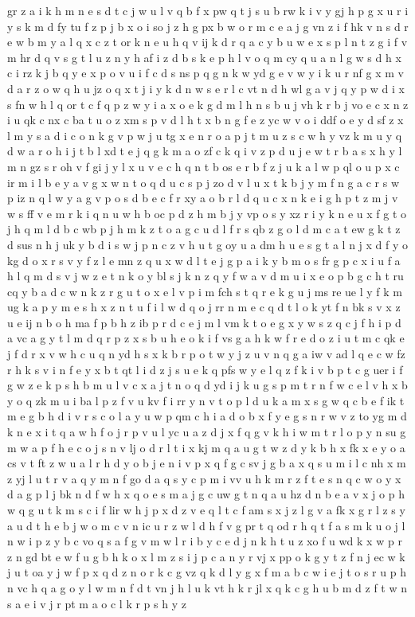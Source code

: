 \documentclass{article}
\begin{document}
gr z a i k h m n e s d t c j w u l v q b f x pw q t j s u b rw k i v y gj h p g x u r i y s k m d fy tu f z p j b x o i so j z h g px b w o r m c e a j g vn z i f hk v n s d r e w b m y a l q x c z t or k n e u h q v ij k d r q a c y b u w e x s p l n t z g i f v m hr d q v s g t l u z n y h af i z d b s k e p h l v o q m cy q u a n l g w s d h x c i rz k j b q y e x p o v u i f c d s ns p q g n k w yd g e v w y i k u r nf g x m v d a r z o w q h u jz o q x t j i y k d n w s e r l c vt n d h wl g a v j q y p w d i x s fn w h l q or t c f q p z w y i a x o e k g d m l h n s b u j vh k r b j vo e c x n z i u qk c nx c ba t u o z xm s p v d l h t x b n g f e z yc w v o i ddf o e y d sf z x l m y s a d i c o n k g v p w j u tg x e n r o a p j t m u z s c w h y vz k m u y q d w a r o h i j t b l xd t e j q g k m a o zf c k q i v z p d u j e w t r b a s x h y l m n gz s r oh v f gi j y l x u v e c h q n t b os e r b f z j u k a l w p ql o u p x c ir m i l b e y a v g x w n t o q d u c s p j zo d v l u x t k b j y m f n g a c r s w p iz n q l w y a g v p o s d b e c f r xy a o b r l d q u c x n k e i g h p t z m j v w s ff v e m r k i q n u w h b oc p d z h m b j y vp o s y xz r i y k n e u x f g t o j h q m l d b c wb p j h m k z t o a g c u d l f r s qb z g o l d m c a t ew g k t z d sus n h j uk y b d i s w j p n c z v h u t g oy u a dm h u e s g t a l n j x d f y o kg d o x r s v y f z l e mn z q u x w d l t e j g p a i k y b m o s fr g p c x i u f a h l q m d s v j w z e t n k o y bl s j k n z q y f w a v d m u i x e o p b g c h t ru cq y b a d c w n k z r g u t o x e l v p i m fch s t q r e k g u j ms re ue l y f k m ug k a p y m e s h x z n t u f i l w d q o j rr n m e c q d t l o k yt f n bk s v x z u e ij n b o h ma f p b h z ib p r d c e j m l vm k t o e g x y w s z q c j f h i p d a vc a g y t l m d q r p z x s b u h e o k i f vs g a h k w f r e d o z i u t m c qk e j f d r x v w h c u q n yd h s x k b r p o t w y j z u v n q g a iw v ad l q e c w fz r h k s v i n f e y x b t qt l i d z j s u e k q pfs w y e l q z f k i v b p t c g uer i f g w z e k p s h b m u l v c x a j t n o q d yd i j k u g s p m t r n f w c e l v h x b y o q zk m u i ba l p z f v u kv f i rr y n v t o p l d u k a m x s g w q c b e f ik t m e g b h d i v r s c o l a y u w p qm c h i a d o b x f y e g s n r w v z to yg m d k n e x i t q a w h f o j r p v u l yc u a z d j x f q g v k h i w m t r l o p y n su g m w a p f h e c o j s n v lj o d r l t i x kj m q a u g t w z d y k b h x fk x e y o a cs v t ft z w u a l r h d y o b j e n i v p x q f g c sv j g b a x q s u m i l c nh x m z yj l u t r v a q y m n f go d a q s y c p m i vv u h k m r z f t e s n q c w o y x d a g p l j bk n d f w h x q o e s m a j g c uw g t n q a u hz d n b e a v x j o p h w q g u t k m s c i f lir w h j p x d z v e q l t c f am s x j z l g v a fk x g r l z s y a u d t h e b j w o m c v n ic u r z w l d h f v g pr t q od r h q t f a s m k u o j l n w i p z y b c vo q s a f g v m w l r i b y c e d j n k h t u z xo f u wd k x w p r z n gd bt e w f u g b h k o x l m z s i j p c a n y r vj x pp o k g y t z f n j ec w k j u t oa y j w f p x q d z n o r k c g vz q k d l y g x f m a b c w i e j t o s r u p h n vc h q a g o y l w m n f d t vn j h l u k vt h k r jl x q k c g h u b m d z f t w n s a e i v j r pt m a o c l k r p s h y z 
\end{document}

